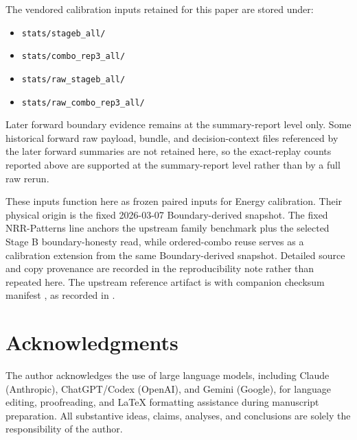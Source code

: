 \documentclass[11pt,a4paper]{article}
\begin{document}
The vendored calibration inputs retained for this paper are stored under:
\begin{itemize}
  \item \texttt{stats/stageb\_all/}
  \item \texttt{stats/combo\_rep3\_all/}
  \item \texttt{stats/raw\_stageb\_all/}
  \item \texttt{stats/raw\_combo\_rep3\_all/}
\end{itemize}

Later forward boundary evidence remains at the summary-report level only. Some
historical forward raw payload, bundle, and decision-context files referenced
by the later forward summaries are not retained here, so the exact-replay
counts reported above are supported at the summary-report level rather than by
a full raw rerun.

These inputs function here as frozen paired inputs for Energy calibration.
Their physical origin is the fixed 2026-03-07 Boundary-derived snapshot. The
fixed NRR-Patterns line anchors the upstream family benchmark plus the selected
Stage B boundary-honesty read, while ordered-combo reuse serves as a
calibration extension from the same Boundary-derived snapshot. Detailed source
and copy provenance are recorded in the reproducibility note rather than
repeated here. The upstream reference artifact is
 with companion
checksum manifest , as recorded in
.

\section*{Acknowledgments}

The author acknowledges the use of large language models, including Claude
(Anthropic), ChatGPT/Codex (OpenAI), and Gemini (Google), for language
editing, proofreading, and LaTeX formatting assistance during manuscript
preparation. All substantive ideas, claims, analyses, and conclusions are
solely the responsibility of the author.
\end{document}
